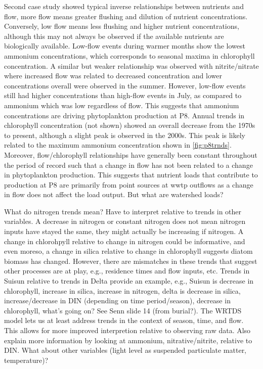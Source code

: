 \documentclass[letterpaper,12pt,oneside]{article}\usepackage[]{graphicx}\usepackage[]{color}
\begin{document}
Second case study showed typical inverse relationships between nutrients and flow, more flow means greater flushing and dilution of nutrient concentrations.  Conversely, low flow means less flushing and higher nutrient concentrations, although this may not always be observed if the available nutrients are biologically available.  Low-flow events during warmer months show the lowest ammonium concentrations, which corresponds to seasonal maxima in chlorophyll concentration.  A similar but weaker relationship was observed with nitrite/nitrate where increased flow was related to decreased concentration and lower concentrations overall were observed in the summer.  However, low-flow events still had higher concentrations than high-flow events in July, as compared to ammonium which was low regardless of flow.  This suggests that ammonium concentrations are driving phytoplankton production at P8.  Annual trends in chlorophyll concentration (not shown) showed an overall decrease from the 1970s to present, although a slight peak is observed in the 2000s.  This peak is likely related to the maximum ammonium concentration shown in \cref{fig:p8trnds}.  Moreover, flow/chlorophyll relationships have generally been constant throughout the period of record such that a change in flow has not been related to a change in phytoplankton production.  This suggests that nutrient loads that contribute to production at P8 are primarily from point sources at \ac{wwtp} outflows as a change in flow does not affect the load output.  But what are watershed loads?  

What do nitrogen trends mean?  Have to interpret relative to trends in other variables.  A decrease in nitrogen or constant nitrogen does not mean nitrogen inputs have stayed the same, they might actually be increasing if nitrogen.  A change in chlorohpyll relative to change in nitrogen could be informative, and even moreso, a change in silica relative to change in chlorophyll suggests diatom biomass has changed.  However, there are mismatches in these trends that suggest other processes are at play, e.g., residence times and flow inputs, etc.  Trends in Suisun relative to trends in Delta provide an example, e.g., Suisun is decrease in chlorophyll, increase in silica, increase in nitrogen, delta is decrease in silica, increase/decrease in DIN (depending on time period/season), decrease in chlorophyll, what's going on? See Senn slide 14 (from burial?). The WRTDS model lets us at least address trends in the context of season, time, and flow.  This allows for more improved interpretion relative to observing raw data. Also explain more information by looking at ammonium, nitrative/nitrite, relative to DIN. What about other variables (light level as suspended particulate matter, temperature)?
\end{document}
